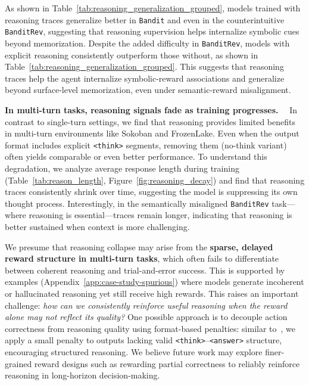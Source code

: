 As shown in Table~\ref{tab:reasoning_generalization_grouped}, models trained with reasoning traces generalize better in \texttt{Bandit} and even in the counterintuitive \texttt{BanditRev}, suggesting that reasoning supervision helps internalize symbolic cues beyond memorization.
Despite the added difficulty in \texttt{BanditRev}, models with explicit reasoning consistently outperform those without, as shown in Table~\ref{tab:reasoning_generalization_grouped}. This suggests that reasoning traces help the agent internalize symbolic-reward associations and generalize beyond surface-level memorization, even under semantic-reward misalignment.




\noindent \textbf{In multi-turn tasks, reasoning signals fade as training progresses.}~~ In contrast to single-turn settings, we find that reasoning provides limited benefits in multi-turn environments like Sokoban and FrozenLake. Even when the output format includes explicit \texttt{<think>} segments, removing them (no-think variant) often yields comparable or even better performance. To understand this degradation, we analyze average response length during training (Table~\ref{tab:reason_length}, Figure~\ref{fig:reasoning_decay}) and find that reasoning traces consistently shrink over time, suggesting the model is suppressing its own thought process. Interestingly, in the semantically misaligned \texttt{BanditRev} task—where reasoning is essential—traces remain longer, indicating that reasoning is better sustained when context is more challenging.

We presume that reasoning collapse may arise from the \textbf{sparse, delayed reward structure in multi-turn tasks}, which often fails to differentiate between coherent reasoning and trial-and-error success. This is supported by examples (Appendix~\ref{app:case-study-spurious}) where models generate incoherent or hallucinated reasoning yet still receive high rewards. This raises an important challenge: \textit{how can we consistently reinforce useful reasoning when the reward alone may not reflect its quality?} One possible approach is to decouple action correctness from reasoning quality using format-based penalties: similar to~\citet{deepseekmath}, we apply a small penalty to outputs lacking valid \texttt{<think>}–\texttt{<answer>} structure, encouraging structured reasoning. We believe future work may explore finer-grained reward designs such as rewarding partial correctness to reliably reinforce reasoning in long-horizon decision-making.



